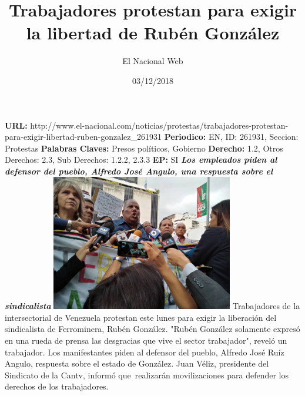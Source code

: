 \documentclass{article}%
\title{\textbf{Trabajadores protestan para exigir la libertad de Rubén González}}%
\author{El Nacional Web}%
\date{03/12/2018}%
\begin{document}
%
\normalsize%
\maketitle%
\textbf{URL: }%
http://www.el{-}nacional.com/noticias/protestas/trabajadores{-}protestan{-}para{-}exigir{-}libertad{-}ruben{-}gonzalez\_261931\newline%
%
\textbf{Periodico: }%
EN, %
ID: %
261931, %
Seccion: %
Protestas\newline%
%
\textbf{Palabras Claves: }%
Presos políticos, Gobierno\newline%
%
\textbf{Derecho: }%
1.2, %
Otros Derechos: %
2.3, %
Sub Derechos: %
1.2.2, 2.3.3\newline%
%
\textbf{EP: }%
SI\newline%
\newline%
%
\textbf{\textit{Los empleados piden al defensor del pueblo, Alfredo José Angulo, una respuesta sobre el sindicalista}}%
\newline%
\newline%
%
\includegraphics[width=300px]{207.jpg}%
\newline%
%
Trabajadores de la intersectorial de Venezuela protestan este lunes para exigir la liberación del sindicalista de Ferrominera, Rubén González.%
\newline%
%
"Rubén González solamente expresó en una rueda de prensa las desgracias que vive el sector trabajador", reveló un trabajador.%
\newline%
%
Los manifestantes piden al defensor del pueblo, Alfredo José Ruíz Angulo, respuesta sobre el estado de González.%
\newline%
%
Juan Véliz, presidente del Sindicato de la Cantv, informó que~realizarán movilizaciones para defender los derechos de los trabajadores.%
\newline%
%
\end{document}
